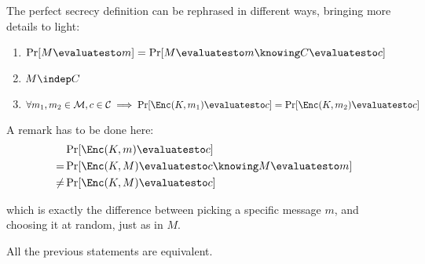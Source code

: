 The perfect secrecy definition can be rephrased in different ways, bringing more details to light:
\begin{enumerate}
    \item $\Pr[M \evaluatesto m] = \Pr[M \evaluatesto m \knowing C \evaluatesto c]$
    \item $M \indep C$
    \item $\forall m_1, m_2 \in \M, c \in \C \implies \Pr[\Enc(K, m_1) \evaluatesto c] = \Pr[\Enc(K, m_2) \evaluatesto c]$
\end{enumerate}

A remark has to be done here:
\begin{align*}
    & \Pr[\Enc(K, m) \evaluatesto c] \\
    =& \Pr[\Enc(K, M) \evaluatesto c \knowing M \evaluatesto m] \\
    \neq& \Pr[\Enc(K, M) \evaluatesto c]
\end{align*}

which is exactly the difference between picking a specific message $m$, and choosing it at random, just as in $M$.
    
\begin{proposition}
    All the previous statements are equivalent.
\end{proposition}

